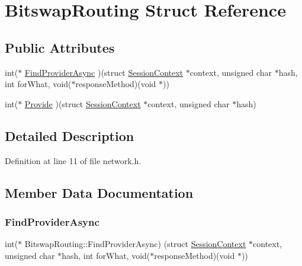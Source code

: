 \hypertarget{struct_bitswap_routing}{}\section{Bitswap\+Routing Struct Reference}
\label{struct_bitswap_routing}
\subsection*{Public Attributes}
\begin{DoxyCompactItemize}
\item 
int($\ast$ \mbox{\hyperlink{struct_bitswap_routing_a416ffa7139f37d088c6a7a206af06312}{Find\+Provider\+Async}} )(struct \mbox{\hyperlink{struct_session_context}{Session\+Context}} $\ast$context, unsigned char $\ast$hash, int for\+What, void($\ast$response\+Method)(void $\ast$))
\item 
int($\ast$ \mbox{\hyperlink{struct_bitswap_routing_ae170479f41cbe75a03223e1971887a1b}{Provide}} )(struct \mbox{\hyperlink{struct_session_context}{Session\+Context}} $\ast$context, unsigned char $\ast$hash)
\end{DoxyCompactItemize}


\subsection{Detailed Description}


Definition at line 11 of file network.\+h.



\subsection{Member Data Documentation}
\mbox{\label{struct_bitswap_routing_a416ffa7139f37d088c6a7a206af06312}} 
\subsubsection{\texorpdfstring{Find\+Provider\+Async}{FindProviderAsync}}
{\footnotesize\ttfamily int($\ast$ Bitswap\+Routing\+::\+Find\+Provider\+Async) (struct \mbox{\hyperlink{struct_session_context}{Session\+Context}} $\ast$context, unsigned char $\ast$hash, int for\+What, void($\ast$response\+Method)(void $\ast$))}

